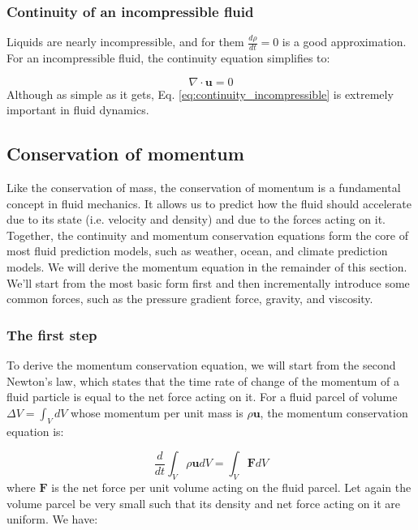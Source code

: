 \documentclass[12pt]{article}
\numberwithin{equation}{section}
\numberwithin{figure}{section}
\numberwithin{table}{section}
\begin{document}
\subsubsection{Continuity of an incompressible fluid}

Liquids are nearly incompressible, and for them $\frac{d\rho}{dt} = 0$ is a good
approximation.
For an incompressible fluid, the continuity equation simplifies to:

\begin{equation}
  \nabla \cdot \mathbf{u} = 0
  \label{eq:continuity_incompressible}
\end{equation}
Although as simple as it gets, Eq. \ref{eq:continuity_incompressible} is
extremely important in fluid dynamics.

\subsection{Conservation of momentum}
\label{sec:momentum}

Like the conservation of mass, the conservation of momentum is a fundamental
concept in fluid mechanics.
It allows us to predict how the fluid should accelerate due to its state
(i.e. velocity and density) and due to the forces acting on it.
Together, the continuity and momentum conservation
equations form the core of most fluid prediction models, such as weather, ocean,
and climate prediction models.
We will derive the momentum equation in the remainder of this section.
We'll start from the most basic form first and then incrementally introduce
some common forces, such as the pressure gradient force, gravity, and viscosity.

\subsubsection{The first step}

To derive the momentum conservation equation, we will start from the second
Newton's law, which states that the time rate of change of the momentum of a
fluid particle is equal to the net force acting on it.
For a fluid parcel of volume $\Delta V = \int_V dV$ whose momentum per unit mass
is $\rho \mathbf{u}$, the momentum conservation equation is:

\begin{equation}
  \frac{d}{dt} \int_V \rho \mathbf{u} dV = \int_V \mathbf{F} dV
\end{equation}
where $\mathbf{F}$ is the net force per unit volume acting on the fluid parcel.
Let again the volume parcel be very small such that its density and net force
acting on it are uniform. We have:
\end{document}
